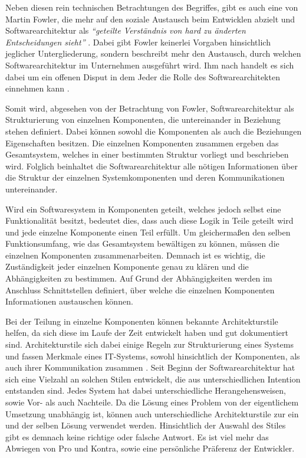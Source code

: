 Neben diesen rein technischen Betrachtungen des Begriffes, gibt es auch eine von Martin Fowler, die mehr auf den soziale Austausch beim Entwicklen abzielt und Softwarearchitektur als  \textit{\enquote{geteilte Verständnis von hard zu änderten Entscheidungen sieht}} \parencite[][S. 3]{fowler_who_2003}. Dabei gibt Fowler keinerlei Vorgaben hinsichtlich jeglicher Untergliederung, sondern beschreibt mehr den Austausch, durch welchen Softwarearchitektur im Unternehmen ausgeführt wird. Ihm nach handelt es sich dabei um ein offenen Disput in dem Jeder die Rolle des Softwarearchitekten einnehmen kann \parencite[][S. 3 f.]{fowler_who_2003}.

Somit wird, abgesehen von der Betrachtung von Fowler, Softwarearchitektur als Strukturierung von einzelnen Komponenten, die untereinander in Beziehung stehen definiert. Dabei können sowohl die Komponenten als auch die Beziehungen Eigenschaften besitzen. Die einzelnen Komponenten zusammen ergeben das Gesamtsystem, welches in einer bestimmten Struktur vorliegt und beschrieben wird. Folglich beinhaltet die Softwarearchitektur alle nötigen Informationen über die Struktur der einzelnen Systemkomponenten und deren Kommunikationen untereinander.

Wird ein Softwaresystem in Komponenten geteilt, welches jedoch selbst eine Funktionalität besitzt, bedeutet dies, dass auch diese Logik in Teile geteilt wird und jede einzelne Komponente einen Teil erfüllt. Um gleichermaßen den selben Funktionsumfang, wie das Gesamtsystem bewältigen zu können, müssen die einzelnen Komponenten zusammenarbeiten. Demnach ist es wichtig, die Zuständigkeit jeder einzelnen Komponente genau zu klären und die Abhängigkeiten zu bestimmen. Auf Grund der Abhängigkeiten werden im Anschluss Schnittstellen definiert, über welche die einzelnen Komponenten Informationen austauschen können.

Bei der Teilung in einzelne Komponenten können bekannte Architekturstile helfen, da sich diese im Laufe der Zeit entwickelt haben und gut dokumentiert sind. Architekturstile sich dabei einige Regeln zur Strukturierung eines Systems und fassen Merkmale eines IT-Systems, sowohl hinsichtlich der Komponenten, als auch ihrer Kommunikation zusammen \parencite[vlg.][S. 102]{starke_effektive_2015}. Seit Beginn der Softwarearchitektur hat sich eine Vielzahl an solchen Stilen entwickelt, die aus unterschiedlichen Intention entstanden sind. Jedes System hat dabei unterschiedliche Herangehensweisen, sowie Vor- als auch Nachteile. Da die Lösung eines Problem von der eigentlichem Umsetzung unabhängig ist, können auch unterschiedliche Architekturstile zur ein und der selben Lösung verwendet werden. Hinsichtlich der Auswahl des Stiles gibt es demnach keine richtige oder falsche Antwort. Es ist viel mehr das Abwiegen von Pro und Kontra, sowie eine persönliche Präferenz der Entwickler.

